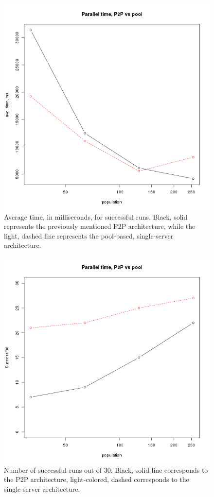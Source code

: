 \documentclass{sig-alternate}
\begin{document}
\begin{figure}[htb]
\centering
   \includegraphics[scale=0.4]{par-pool-time-pop.png}
\caption{Average time, in milliseconds, for successful runs. Black,
  solid represents the previously mentioned P2P architecture, while
  the light, dashed line represents the pool-based, single-server
  architecture. }
\label{fig:p:time}
\end{figure}
%
\begin{figure}[htb]
\centering
   \includegraphics[scale=0.4]{par-pool-hits-pop.png}
\caption{Number of successful runs out of 30. Black, solid line
  corresponds to the P2P architecture, light-colored, dashed
corresponds to the single-server architecture.}
\label{fig:p:hits}
\end{figure}
\end{document}

